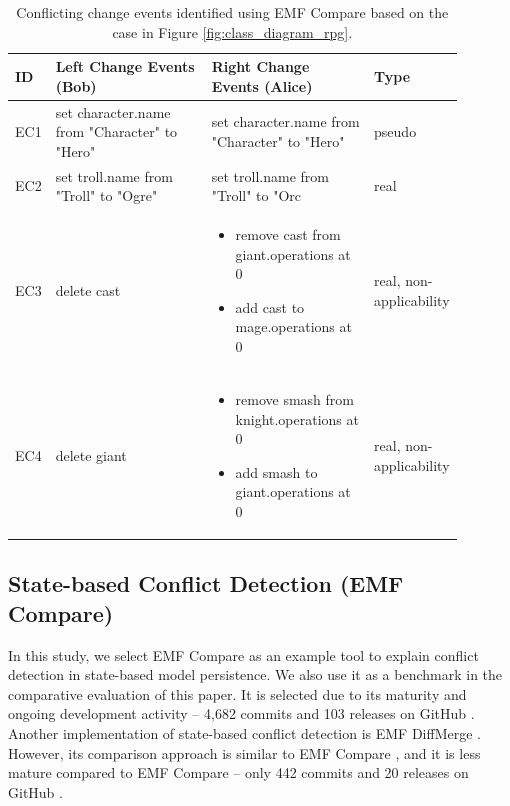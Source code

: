 \begin{table}[ht]
\centering
\caption{Conflicting change events identified using EMF Compare based on the case in Figure \ref{fig:class_diagram_rpg}.}
\label{table:emfc_conflicts}
\begin{tabular}{|p{0.04\linewidth}|p{0.37\linewidth}|p{0.37\linewidth}|
		p{0.11\linewidth}|}
	\hline
	\textbf{ID} & 
	\textbf{Left Change Events (Bob)} & 
	\textbf{Right Change Events (Alice)} & 
	\textbf{Type}\\ 
	\hline
	EC1 & 
	set character.name from "Character" to "Hero" & 
	set character.name from "Character" to "Hero" & 
	pseudo \\
	\hline
	EC2 & set troll.name from "Troll" to "Ogre" & 
	set troll.name from "Troll" to "Orc & 
	real \\ 
	\hline
	EC3 & 
	delete cast
	& 
	\begin{minipage}[t]{\linewidth}
		\raggedright
		\begin{itemize}[leftmargin=0pt]
			\setlength
			\item[] remove cast from giant.operations at 0
			\item[] add cast to mage.operations at 0
		\end{itemize}
	\end{minipage}
	& 
	real, non-applicability\\
	\hline
	EC4 & 
	delete giant
	& 
	\begin{minipage}[t]{\linewidth}
		\raggedright
		\begin{itemize}[leftmargin=0pt]
			\setlength
			\item[] remove smash from knight.operations at 0
			\item[] add smash to giant.operations at 0
		\end{itemize}
	\end{minipage}
	& 
	real, non-applicability\\
	\hline
\end{tabular}
\end{table}

\subsection{State-based Conflict Detection (EMF Compare)}
\label{sec:emfcompare_conflict_detection}

In this study, we select EMF Compare \cite{emfcompare2018developer} as an example tool to explain conflict detection in state-based model persistence. We also use it as a benchmark in the comparative evaluation of this paper. It is selected due to its maturity and ongoing development activity -- 4,682 commits and 103 releases on GitHub \cite{github2019emfcompare}. Another implementation of state-based conflict detection is EMF DiffMerge \cite{eclipse2019emfdiffmerge}. However, its comparison approach is similar to EMF Compare \cite{eclipse2019emfdiffmerge}, and it is less mature compared to EMF Compare -- only 442 commits and 20 releases on GitHub \cite{github2019emfdiffmerge}.

